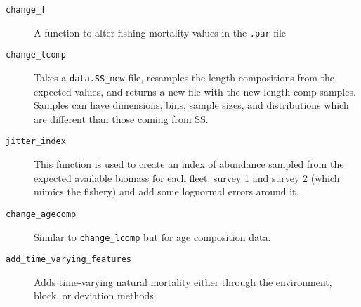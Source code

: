 \documentclass[12pt]{article}
\begin{document}
\begin{description}
  \item[\texttt{change\_f}] A function to alter fishing mortality values in the
    \texttt{.par} file
  \item[\texttt{change\_lcomp}] Takes a \texttt{data.SS\_new} file, resamples the length
    compositions from the expected values, and returns a new file with the new
    length comp samples. Samples can have dimensions, bins, sample sizes, and
    distributions which are different than those coming from SS.
  \item[\texttt{jitter\_index}] This function is used to create an index of
    abundance sampled from the expected available biomass for each fleet: survey
    1 and survey 2 (which mimics the fishery) and add some lognormal errors around
    it.
  \item[\texttt{change\_agecomp}] Similar to \texttt{change\_lcomp} but for age
    composition data.
  \item[\texttt{add\_time\_varying\_features}] Adds time-varying natural
    mortality either through the environment, block, or deviation methods.
\end{description}


%
\end{document}

